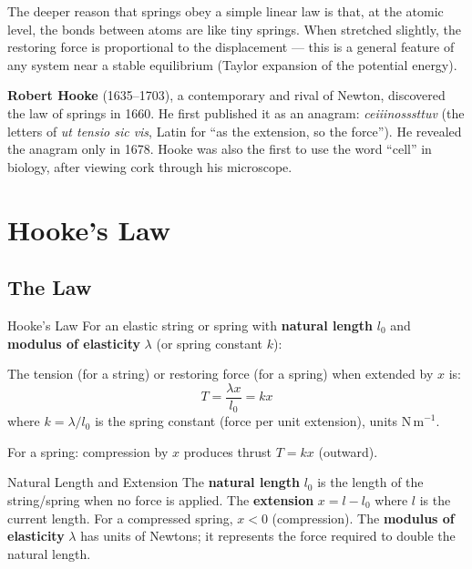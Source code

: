 \documentclass[12pt, a4paper]{book}
\begin{document}
\begin{intuitionbox}
The deeper reason that springs obey a simple linear law is that, at the atomic level, the bonds between atoms are like tiny springs. When stretched slightly, the restoring force is proportional to the displacement --- this is a general feature of any system near a stable equilibrium (Taylor expansion of the potential energy).
\end{intuitionbox}

\begin{historicalbox}
\textbf{Robert Hooke} (1635--1703), a contemporary and rival of Newton, discovered the law of springs in 1660. He first published it as an anagram: \emph{ceiiinosssttuv} (the letters of \emph{ut tensio sic vis}, Latin for ``as the extension, so the force''). He revealed the anagram only in 1678. Hooke was also the first to use the word ``cell'' in biology, after viewing cork through his microscope.
\end{historicalbox}

\section{Hooke's Law}

\subsection{The Law}

\begin{thm}{Hooke's Law}{}
For an elastic string or spring with \textbf{natural length} $l_0$ and \textbf{modulus of elasticity} $\lambda$ (or spring constant $k$):

The tension (for a string) or restoring force (for a spring) when extended by $x$ is:
\[
  \boxed{T = \frac{\lambda x}{l_0} = kx}
\]
where $k = \lambda/l_0$ is the spring constant (force per unit extension), units $\mathrm{N\,m}^{-1}$.

For a spring: compression by $x$ produces thrust $T = kx$ (outward).
\end{thm}

\begin{defn}{Natural Length and Extension}{}
The \textbf{natural length} $l_0$ is the length of the string/spring when no force is applied.
The \textbf{extension} $x = l - l_0$ where $l$ is the current length. For a compressed spring, $x < 0$ (compression).
The \textbf{modulus of elasticity} $\lambda$ has units of Newtons; it represents the force required to double the natural length.
\end{defn}
\end{document}
